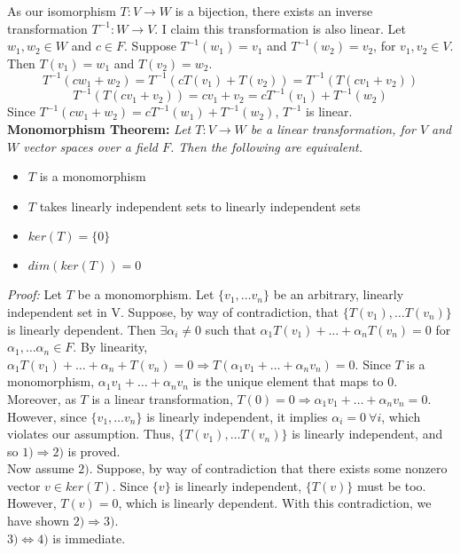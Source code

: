 \documentclass[12pt]{article}
\begin{document}
As our isomorphism $T: V \rightarrow W$ is a bijection, there exists an inverse transformation $T^{-1} : W \rightarrow V$. I claim this transformation is also linear. Let $w_1, w_2 \in W$ and $c \in F$. Suppose $T^{-1}(w_1) = v_1$ and $T^{-1}(w_2) = v_2$, for $v_1, v_2 \in V$. Then $T(v_1) = w_1$ and $T(v_2) = w_2$.
$$T^{-1}(c w_1 + w_2) = T^{-1}(cT(v_1) + T(v_2)) = T^{-1}(T(c v_1 + v_2))$$ 
$$T^{-1}(T(c v_1 + v_2)) = c v_1 + v_2 = c T^{-1}(v_1) + T^{-1}(w_2)$$
Since $T^{-1}(c w_1 + w_2) = c T^{-1}(w_1) + T^{-1}(w_2)$, $T^{-1}$ is linear.\\

\textbf{Monomorphism Theorem: }\emph{Let $T: V \rightarrow W$ be a linear transformation, for $V$ and $W$ vector spaces over a field $F$. Then the following are equivalent.}
\begin{itemize}
\item $T$ is a monomorphism
\item $T$ takes linearly independent sets to linearly independent sets
\item $ker(T) = \{ 0 \}$
\item $dim(ker(T)) = 0$
\end{itemize}
\emph{Proof: }Let $T$ be a monomorphism. Let $\{ v_1, \dots v_n \}$ be an arbitrary, linearly independent set in V. Suppose, by way of contradiction, that $\{ T(v_1), \dots T(v_n) \}$ is linearly dependent. Then $\exists \alpha_i \neq 0$ such that $\alpha_1 T(v_1) + \dots + \alpha_n T(v_n) = 0$ for $\alpha_1, \dots \alpha_n \in F$. By linearity, $\alpha_1 T(v_1) + \dots + \alpha_n + T(v_n) = 0 \Rightarrow T(\alpha_1 v_1 + \dots + \alpha_n v_n) = 0$. Since $T$ is a monomorphism, $\alpha_1 v_1 + \dots + \alpha_n v_n$ is the unique element that maps to $0$. Moreover, as $T$ is a linear transformation, $T(0) = 0 \Rightarrow \alpha_1 v_1 + \dots + \alpha_n v_n = 0$. However, since $\{ v_1, \dots v_n \}$ is linearly independent, it implies $\alpha_i = 0\ \forall i$, which violates our assumption. Thus, $\{ T(v_1), \dots T(v_n) \}$ is linearly independent, and so $1) \Rightarrow 2)$ is proved.\\

Now assume $2)$. Suppose, by way of contradiction that there exists some nonzero vector $v \in ker(T)$. Since $\{ v \}$ is linearly independent, $\{ T(v) \}$ must be too. However, $T(v) = 0$, which is linearly dependent. With this contradiction, we have shown $2) \Rightarrow 3)$. \\
 
$3) \Leftrightarrow 4)$ is immediate. \\
 
\end{document}
